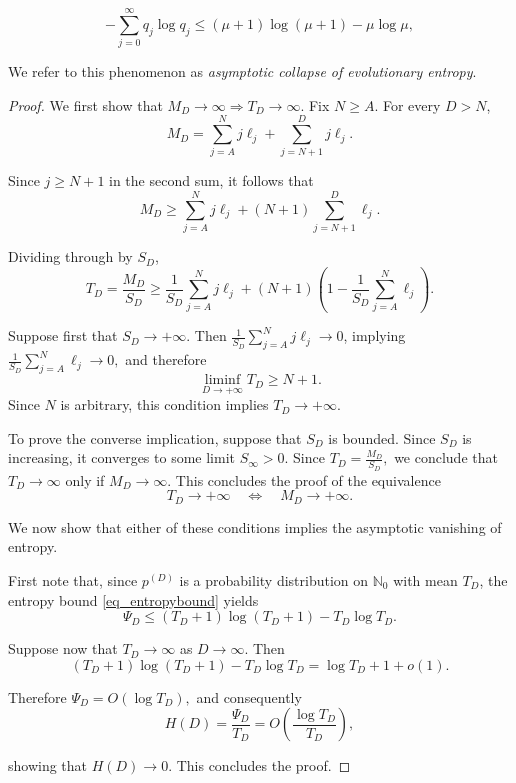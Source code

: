 \documentclass[10pt,a4paper]{amsart}
\begin{document}
\begin{equation}
\label{eq_entropybound}
-
\sum_{j=0}^{\infty}
q_j\log q_j
\leq
(\mu+1)\log(\mu+1)-\mu\log\mu,
\end{equation}

\begin{rem}
We refer to this phenomenon as {\em asymptotic collapse of evolutionary entropy}.
\end{rem}

\begin{proof}

We first show that
$
M_D\to\infty
\Longrightarrow
T_D\to\infty.
$
Fix \(N\geq A\). For every \(D>N\),
\[
M_D
=
\sum_{j=A}^{N} j\ell_j
+
\sum_{j=N+1}^{D} j\ell_j.
\]

Since \(j\geq N+1\) in the second sum, it follows that
\[ 
M_D
\geq
\sum_{j=A}^{N} j\ell_j
+
(N+1)
\sum_{j=N+1}^{D}\ell_j.
\]

Dividing through by \(S_D\),
\[
T_D
=
\frac{M_D}{S_D}
\geq
\frac1{S_D}
\sum_{j=A}^{N} j\ell_j
+
(N+1)
\left(
1-
\frac1{S_D}
\sum_{j=A}^{N}\ell_j
\right).
\]

\noindent Suppose first that \(S_D\to+\infty\). Then
$
\frac1{S_D}
\sum_{j=A}^{N} j\ell_j
\to0 $, implying 
$
\frac1{S_D}
\sum_{j=A}^{N}\ell_j
\to0, 
$ and therefore
\[
\liminf_{D\to+\infty}T_D
\geq
N+1.
\]
Since \(N\) is arbitrary, this condition  implies
$
T_D\to+\infty.
$

To prove the converse implication, suppose that \(S_D\) is bounded.
Since \(S_D\) is increasing, it converges to some limit $
S_\infty>0.$ 
Since 
$
T_D
=
\frac{M_D}{S_D},
$
we conclude that \(T_D\to\infty\) only if \(M_D\to\infty\). This concludes the proof of the equivalence
\[
T_D\to+\infty
\quad\Longleftrightarrow\quad
M_D\to+\infty.
\]

We now show that either of these conditions implies the asymptotic vanishing of entropy.


First note that, since \(p^{(D)}\) is a probability distribution on
\(\mathbb N_0\) with mean \(T_D\), the entropy bound
\eqref{eq_entropybound} yields
\[
\Psi_D
\leq
(T_D+1)\log(T_D+1)
-
T_D\log T_D.
\]


Suppose now that $T_D \to \infty$ as $D \to \infty$. Then 
\[
(T_D+1)\log(T_D+1)
-
T_D\log T_D
=
\log T_D+1+o(1).
\]

Therefore
$
\Psi_D
=
O(\log T_D),
$
and consequently
\[
H(D)
=
\frac{\Psi_D}{T_D}
=
O\!\left(
\frac{\log T_D}{T_D}
\right),
\]

showing that
$
H(D)\to0
$. This concludes the proof.

\end{proof}
\end{document}
